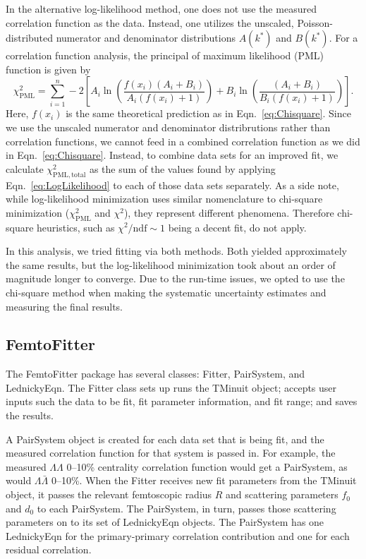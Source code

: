 In the alternative log-likelihood method, one does not use the measured correlation function as the data.
Instead, one utilizes the unscaled, Poisson-distributed numerator and denominator distributions $A(k^*)$ and $B(k^*)$.
For a correlation function analysis, the principal of maximum likelihood (PML) function is given \cite{Ahle:2002mi} by
\begin{equation}
\label{eq:LogLikelihood}
\chi^2_{\mathrm{PML}} = \sum_{i = 1}^{n} 
-2 \left[A_i \ln  \left(\frac{f(x_i) (A_i + B_i)}{A_i(f(x_i) + 1)}\right) + B_i \ln \left(\frac{(A_i + B_i)}{B_i(f(x_i) + 1)}\right)\right].
\end{equation}
Here, $f(x_i)$ is the same theoretical prediction as in Eqn.\ \ref{eq:Chisquare}.
Since we use the unscaled numerator and denominator distribrutions rather than correlation functions, we cannot feed in a combined correlation function as we did in Eqn.\ \ref{eq:Chisquare}. Instead, to combine data sets for an improved fit, we calculate $\chi^2_\mathrm{PML,total}$ as the sum of the values found by applying Eqn.\ \ref{eq:LogLikelihood} to each of those data sets separately.
As a side note, while log-likelihood minimization uses similar nomenclature to chi-square minimization ($\chi^2_\mathrm{PML}$ and $\chi^2$), they represent different phenomena. Therefore chi-square heuristics, such as $\chi^2 / \mathrm{ndf} \sim 1$ being a decent fit, do not apply.

In this analysis, we tried fitting via both methods. 
Both yielded approximately the same results, but the log-likelihood minimization took about an order of magnitude longer to converge. 
Due to the run-time issues, we opted to use the chi-square method when making the systematic uncertainty estimates and measuring the final results.

\subsection{FemtoFitter}
\label{sec:FemtoFitter}

The FemtoFitter package has several classes: Fitter, PairSystem, and LednickyEqn.
The Fitter class sets up runs the TMinuit object; accepts user inputs such the data to be fit, fit parameter information, and fit range; and saves the results.

A PairSystem object is created for each data set that is being fit, and the measured correlation function for that system is passed in. 
For example, the measured $\Lambda\Lambda$ 0--10\% centrality correlation function would get a PairSystem, as would $\Lambda\bar{\Lambda}$ 0--10\%.
When the Fitter receives new fit parameters from the TMinuit object, it passes the relevant femtoscopic radius $R$ and scattering parameters $f_0$ and $d_0$ to each PairSystem.
The PairSystem, in turn, passes those scattering parameters on to its set of LednickyEqn objects.
The PairSystem has one LednickyEqn for the primary-primary correlation contribution and one for each residual correlation.

